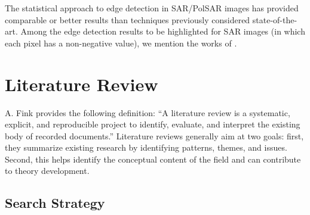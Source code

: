 The statistical approach to edge detection in SAR/PolSAR images has provided comparable or better results than techniques previously considered state-of-the-art. Among the edge detection results to be highlighted for SAR images (in which each pixel has a non-negative value), we mention the works of \cite{gambini2008accuracy, giron2012nonparametric}.


\section{Literature Review}
A. Fink \cite{fink2019conducting} provides the following definition: ``A literature review is a systematic, explicit, and reproducible project to identify, evaluate, and interpret the existing body of recorded documents.''  Literature reviews generally aim at two goals: first, they summarize existing research by identifying patterns, themes, and issues. Second, this helps identify the conceptual content of the field and can contribute to theory development.

\subsection{Search Strategy}

